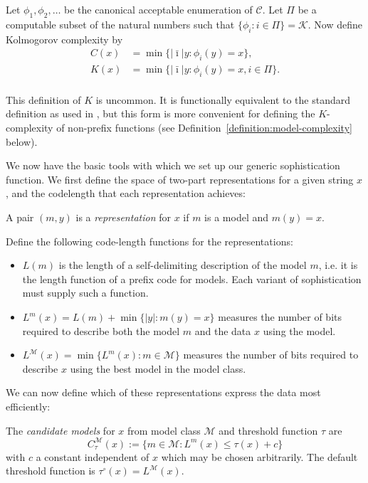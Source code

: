 \documentclass{style/llncs}
\newcommand{\M}{\mathscr M}
\newcommand{\C}{\mathscr C}
\newcommand{\K}{\mathscr K}
\begin{document}
\begin{definition}[Complexity]
Let $\phi_1,\phi_2,\ldots$ be the canonical acceptable enumeration of $\C$. Let $\Pi$ be a computable subset of the natural numbers such that  $\{\phi_i:i\in\Pi\} = \K$. Now define Kolmogorov complexity by
\begin{align*}
C(x)&=\min\{|\bar\imath| y:\phi_i(y)=x\},\\
K(x)&=\min\{|\bar\imath| y:\phi_i(y)=x, i\in\Pi\}.\\
\end{align*}
\end{definition}
This definition of $K$ is uncommon. It is functionally equivalent to the standard definition as used in \cite{li1993introduction}, but this form is more convenient for defining the $K$-complexity of non-prefix functions (see Definition~\ref{definition:model-complexity} below).

We now have the basic tools with which we set up our generic sophistication function. We first define the space of two-part representations for a given string $x$, and the codelength that each representation achieves:

\begin{definition}
A pair $(m,y)$ is a \emph{representation} for $x$ if $m$ is a model and $m(y)=x$. 

Define the following code-length functions for the representations:
\begin{itemize}
\item $L(m)$ is the length of a self-delimiting description of
  the model $m$, i.e. it is the length function of a prefix code for models. Each variant of sophistication must supply such a function.
\item $L^m(x)=L(m)+\min\{|y|:m(y)=x\}$ measures the number of bits required to describe both the model $m$ and the data $x$ using the model.
\item $L^\M(x)=\min\{L^m(x):m\in\M\}$ measures the number of bits
  required to describe $x$ using the best model in the model class.
\end{itemize}
\end{definition}
We can now define which of these representations express the data most efficiently:
\begin{definition}
The \emph{candidate models} for $x$ from model class $\M$ and threshold function $\tau$ are
\[
  C^\M_\tau(x):=\{m\in\M:L^m(x)\le \tau(x) + c\}
\]
with $c$ a constant independent of $x$ which may be chosen arbitrarily. The default threshold function is $\tau^\circ(x)=L^\M(x)$.
\end{definition}
\end{document}
